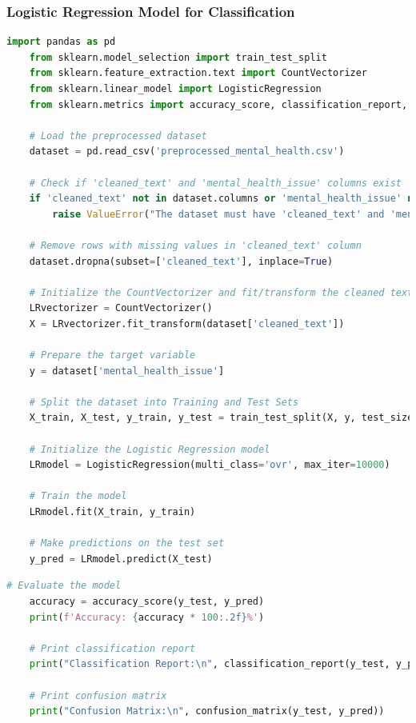 \subsubsection{Logistic Regression Model for Classification}

\begin{tcolorbox}[colback=gray!5!white, colframe=gray!80!black, boxrule=0.5pt, title=Logistic Regression for Mental Health Classification]
    \begin{lstlisting}[language=Python]
    import pandas as pd
    from sklearn.model_selection import train_test_split
    from sklearn.feature_extraction.text import CountVectorizer
    from sklearn.linear_model import LogisticRegression
    from sklearn.metrics import accuracy_score, classification_report, confusion_matrix

    # Load the preprocessed dataset
    dataset = pd.read_csv('preprocessed_mental_health.csv')

    # Check if 'cleaned_text' and 'mental_health_issue' columns exist
    if 'cleaned_text' not in dataset.columns or 'mental_health_issue' not in dataset.columns:
        raise ValueError("The dataset must have 'cleaned_text' and 'mental_health_issue' columns.")

    # Remove rows with missing values in 'cleaned_text' column
    dataset.dropna(subset=['cleaned_text'], inplace=True)

    # Initialize the CountVectorizer and fit/transform the cleaned text
    LRvectorizer = CountVectorizer()
    X = LRvectorizer.fit_transform(dataset['cleaned_text'])

    # Prepare the target variable
    y = dataset['mental_health_issue']

    # Split the dataset into Training and Test Sets
    X_train, X_test, y_train, y_test = train_test_split(X, y, test_size=0.2, random_state=42)

    # Initialize the Logistic Regression model
    LRmodel = LogisticRegression(multi_class='ovr', max_iter=10000)

    # Train the model
    LRmodel.fit(X_train, y_train)

    # Make predictions on the test set
    y_pred = LRmodel.predict(X_test)

\end{lstlisting}
\end{tcolorbox}

\begin{tcolorbox}[colback=gray!5!white, colframe=gray!80!black, boxrule=0.5pt, title=Logistic Regression for Mental Health Classification]
    \begin{lstlisting}[language=Python]
    # Evaluate the model
    accuracy = accuracy_score(y_test, y_pred)
    print(f'Accuracy: {accuracy * 100:.2f}%')

    # Print classification report
    print("Classification Report:\n", classification_report(y_test, y_pred))

    # Print confusion matrix
    print("Confusion Matrix:\n", confusion_matrix(y_test, y_pred))
    \end{lstlisting}
\end{tcolorbox}

